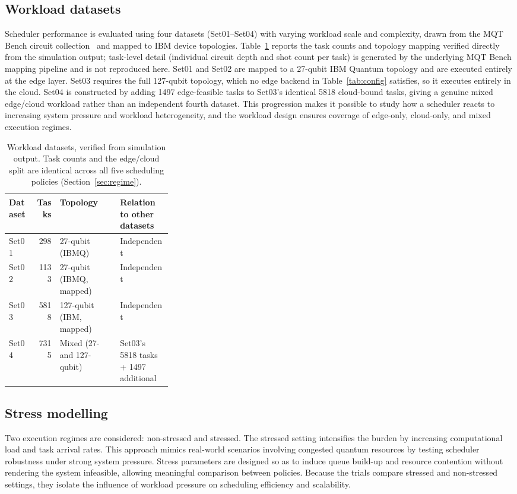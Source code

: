 \documentclass[preprint,12pt]{elsarticle}
\begin{document}
\subsection{Workload datasets}
Scheduler performance is evaluated using four datasets (Set01--Set04) with
varying workload scale and complexity, drawn from the MQT Bench circuit
collection~\cite{quetschlich2023} and mapped to IBM device topologies.
Table~\ref{tab:workload} reports the task counts and topology mapping verified
directly from the simulation output; task-level detail (individual circuit
depth and shot count per task) is generated by the underlying MQT Bench
mapping pipeline and is not reproduced here. Set01 and Set02 are mapped to a
27-qubit IBM Quantum topology and are executed entirely at the edge layer.
Set03 requires the full 127-qubit topology, which no edge backend in
Table~\ref{tab:config} satisfies, so it executes entirely in the cloud. Set04
is constructed by adding 1497 edge-feasible tasks to Set03's identical 5818
cloud-bound tasks, giving a genuine mixed edge/cloud workload rather than an
independent fourth dataset. This progression makes it possible to study how a
scheduler reacts to increasing system pressure and workload heterogeneity, and
the workload design ensures coverage of edge-only, cloud-only, and mixed
execution regimes.

\begin{table}[htbp]
\centering
\caption{Workload datasets, verified from simulation output. Task counts and
the edge/cloud split are identical across all five scheduling policies
(Section~\ref{sec:regime}).}
\label{tab:workload}
\small
\begin{tabular}{lrlp{0.32\linewidth}}
\toprule
\textbf{Dataset} & \textbf{Tasks} & \textbf{Topology} & \textbf{Relation to other datasets} \\
\midrule
Set01 & 298  & 27-qubit (IBMQ) & Independent \\
Set02 & 1133 & 27-qubit (IBMQ, mapped) & Independent \\
Set03 & 5818 & 127-qubit (IBM, mapped) & Independent \\
Set04 & 7315 & Mixed (27- and 127-qubit) & Set03's 5818 tasks + 1497 additional \\
\bottomrule
\end{tabular}
\end{table}

\subsection{Stress modelling}
Two execution regimes are considered: non-stressed and stressed. The stressed
setting intensifies the burden by increasing computational load and task arrival
rates. This approach mimics real-world scenarios involving congested quantum
resources by testing scheduler robustness under strong system pressure. Stress
parameters are designed so as to induce queue build-up and resource contention
without rendering the system infeasible, allowing meaningful comparison between
policies. Because the trials compare stressed and non-stressed settings, they
isolate the influence of workload pressure on scheduling efficiency and
scalability.
\end{document}
